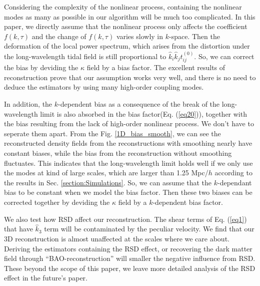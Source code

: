 \documentclass[aps,prd,twocolumn,showpacs,superscriptaddress,groupedaddress,nofootinbib]{revtex4}  %
\begin{document}
Considering the complexity of the nonlinear process, containing the nonlinear modes as many as possible in our algorithm will be much too complicated. In this paper, we directly assume that the nonlinear process only affects the coefficient $f(k,\tau)$ and the change of $f(k,\tau)$ varies slowly in $k$-space. Then the deformation of the local power spectrum, which arises from the distortion under the long-wavelength tidal field is still proportional to $\hat{k}_{i}\hat{k}_{j}t^{(0)}_{ij}$. So, we can correct the bias by deviding the $\kappa$ field by a bias factor. The excellent results of reconstruction prove that our assumption works very well, and there is no need to deduce the estimators by using many high-order coupling modes. 

In addition, the $k$-dependent bias as a consequence of the break of the long-wavelength limit is also absorbed in the bias factor(Eq. (\ref{eq20})), together with the bias resulting from the lack of high-order nonlinear process. We don't have to seperate them apart. From the Fig. \ref{1D_bias_smooth}, we can see the reconstructed density fields from the reconstructions with smoothing nearly have constant biases, while the bias from the reconstruction without smoothing fluctuates. This indicates that the long-wavelength limit holds well if we only use the modes at kind of large scales, which are larger than 1.25 Mpc/$h$ according to the results in Sec. \ref{section:Simulations}. So, we can assume that the $k$-dependant bias to be constant when we model the bias factor. Then these two biases can be corrected together by deviding the $\kappa$ field by a $k$-dependent bias factor.

We also test how RSD affect our reconstruction. The shear terms of Eq. (\ref{eq1}) that have $\hat{k}_{3}$ term will be contaminated by the peculiar velocity. We find that our 3D reconstruction is almost unaffected at the scales where we care about. Deriving the estimators containing the RSD effect, or recovering the dark matter field through ``BAO-reconstruction''\cite{2015arXiv151100663S} will smaller the negative influence from RSD. These beyond the scope of this paper, we leave more detailed analysis of the RSD effect in the future's paper.

\end{document}
